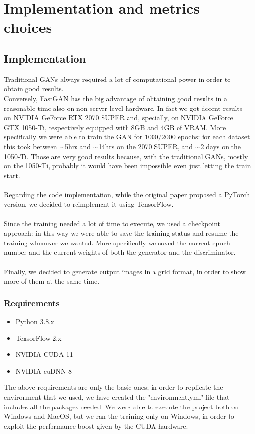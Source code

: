 \documentclass[12pt]{article}
\begin{document}

\section{Implementation and metrics choices}
\large

\subsection{Implementation}

Traditional GANs always required a lot of computational power in order to obtain good results.\\
Conversely, FastGAN has the big advantage of obtaining good results in a reasonable time also on non server-level hardware.
In fact we got decent results on NVIDIA GeForce RTX 2070 SUPER and, specially, on NVIDIA GeForce GTX 1050-Ti, 
respectively equipped with 8GB and 4GB of VRAM. More specifically we were able to train the GAN for 1000/2000 epochs: for each dataset this
took between $\sim$5hrs and $\sim$14hrs on the 2070 SUPER, and $\sim$2 days on the 1050-Ti. Those are very good results because, with the traditional
GANs, mostly on the 1050-Ti, probably it would have been impossible even just letting the train start.\\\\
Regarding the code implementation, while the original paper proposed a PyTorch version, we decided to reimplement it using 
TensorFlow.\\\\
Since the training needed a lot of time to execute, we used a checkpoint approach: in this way 
we were able to save the training status and resume the training whenever we wanted. 
More specifically we saved the current epoch number and the current weights of both the generator and
the discriminator.\\\\
Finally, we decided to generate output images in a grid format, in order to show more of them at the same time.


\subsubsection{Requirements}
\large

\begin{itemize}
	\item Python 3.8.x
	\item TensorFlow 2.x
	\item NVIDIA CUDA 11
	\item NVIDIA cuDNN 8
\end{itemize}
The above requirements are only the basic ones; in order to replicate the environment that we used, we have created
the "environment.yml" file that includes all the packages needed.
We were able to execute the project both on Windows and MacOS, but we ran the training only on Windows, 
in order to exploit the performance boost given by the CUDA hardware.
\end{document}
